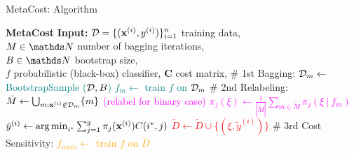 \documentclass[11pt,compress,t,notes=noshow, xcolor=table]{beamer}
\begin{document}
\begin{vbframe}{MetaCost: Algorithm}
{\begin{minipage}{0.45\textwidth}
\begin{algorithmic}
				\tiny
%				
				\State \textbf{MetaCost}  
				\State \textbf{Input:} 
				$\mathcal{D} = \{(\mathbf{x}^{(i)},y^{(i)})\}_{i=1}^n$ training data, \\
				$M \in \N$ number of bagging iterations, \\
				$B \in \N$ bootstrap size, \\
				$f$ probabilistic (black-box) classifier, 
				$\mathbf{C}$ cost matrix, 
				\State \# 1st Bagging:
				\textcolor{teal}{
					\State $\mathcal{D}_m  \leftarrow $ BootstrapSample ($\mathcal{D},B$)
					\State $f_m  \leftarrow $ train $f$ on $\mathcal{D}_m$
				\EndFor}
				\State \# 2nd Relabeling:
				\textcolor{blue}{
					\State $\tilde M \leftarrow \bigcup_{m: \mathbf{x}^{(i)} \notin \mathcal{D}_m} \{m\}$
					\EndFor}
					\textcolor{magenta}{ (relabel for binary case)
						\State $\pi_j(\xi)  \leftarrow \frac{1}{|\tilde M| } \sum_{m \in \tilde M}   \pi_j(\xi~|~ f_m) $
					\EndFor}
                        \textcolor{red}{\State $\tilde y^{(i)} \leftarrow \operatorname{arg\,min}_{i^*} \sum_{j=1}^g \pi_j(\mathbf{x}^{(i)}) C(i^*,j) $
					\State $\tilde D \leftarrow \tilde D \cup \{(\xi,\tilde y^{(i)})\} $
				\EndFor}
				\State \# 3rd Cost Sensitivity:
%				
				\textcolor{orange}{\State $f_{meta} \leftarrow$ train $f$ on $\tilde D$}
%			
			\end{algorithmic}
		\end{minipage}
	}
\end{vbframe}




\end{document}
